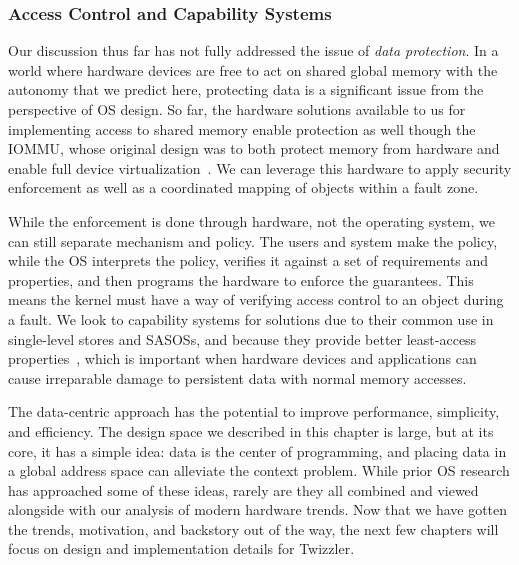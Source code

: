 \subsubsection{Access Control and Capability Systems}
Our discussion thus far has not fully addressed the issue of \emph{data protection}. In a world
where hardware devices are free to act on shared global memory with the autonomy that we predict
here, protecting data is a significant issue from the perspective of OS design. So far, the hardware
solutions available to us for implementing access to shared memory enable
protection as well though the IOMMU, whose original design was to both protect memory from hardware
and enable full device virtualization~\cite{markuze2016true}. We can leverage this hardware to apply
security enforcement as well as a coordinated mapping of objects within a fault zone.

While the enforcement is done through hardware, not the operating system, we can still separate mechanism and policy. The users
and system make the policy, while the OS interprets the policy, verifies it against a
set of requirements and properties, and then programs the hardware to enforce the guarantees. This
means the kernel must have a way of verifying access control to an object during a fault. We look to
capability systems for solutions due to their common use in single-level stores and SASOSs, and
because they provide better least-access properties~\cite{capmyth}, which is important when hardware devices and
applications can cause irreparable damage to persistent data with normal memory accesses.


\begin{chconc}
    The data-centric approach has the potential to improve performance, simplicity, and efficiency. The design space we
    described in this chapter is large, but at its core, it has a simple idea: data is the center of programming, and
    placing data in a global address space can alleviate the context problem. While prior OS research has approached
    some of these ideas, rarely are they all combined and viewed alongside with our analysis of modern hardware trends.
    Now that we have gotten the trends, motivation, and backstory out of the way, the next few chapters will focus on
    design and implementation details for Twizzler.
\end{chconc}